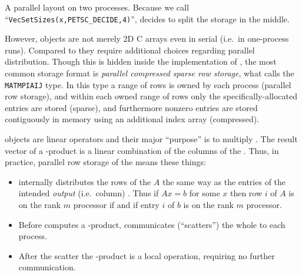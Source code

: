 \begin{marginfigure}
\bigskip
\caption{A parallel \pVec layout on two processes.  Because we call ``\texttt{VecSetSizes(x,PETSC\_DECIDE,4)}'', \PETSc decides to split the storage in the middle.}
\label{fig:mpitwoveclayout}
\end{marginfigure}

However, \pMat objects are not merely 2D C arrays even in serial (i.e.~in one-process runs).  Compared to \pVecs they require additional choices regarding parallel distribution.  Though this is hidden inside the implementation of \pMat, the most common storage format is \emph{parallel compressed sparse row storage}, what \PETSc calls the \texttt{MATMPIAIJ} type.  In this type a range of rows is owned by each process (parallel row storage), and within each owned range of rows only the specifically-allocated entries are stored (sparse), and furthermore nonzero entries are stored contiguously in memory using an additional index array (compressed).

\pMat objects are linear operators and their major ``purpose'' is to multiply \pVecs.  The result vector of a \pMat-\pVec product is a linear combination of the columns of the \pMat.  Thus, in practice, parallel row storage of the \pMat means these things:
\begin{itemize}
\item \PETSc internally distributes the rows of the \pMat $A$ the same way as the entries of the intended \emph{output} (i.e.~column) \pVec.  Thus if $Ax=b$ for some $x$ then row $i$ of $A$ is on the rank $m$ processor if and if entry $i$ of $b$ is on the rank $m$ processor.
\item Before \PETSc computes a \pMat-\pVec product, \PETSc communicates (``scatters'') the whole \pVec to each process.
\item After the scatter the \pMat-\pVec product is a local operation, requiring no further communication.
\end{itemize}

